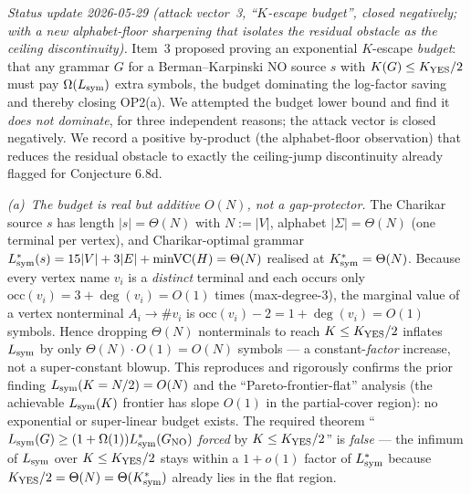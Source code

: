 \documentclass[
]{article}
\begin{document}
\emph{Status update 2026-05-29 (attack vector~3, ``$K$-escape budget'',
closed negatively; with a new alphabet-floor sharpening that
isolates the residual obstacle as the ceiling discontinuity).} Item~3
proposed proving an exponential $K$-escape \emph{budget}: that any
grammar $G$ for a Berman--Karpinski NO source $s$ with $K(G) \leq
K_{\rm YES}/2$ must pay $\Omega(L_{\rm sym})$ extra symbols, the budget
dominating the log-factor saving and thereby closing OP2(a). We
attempted the budget lower bound and find it \emph{does not dominate},
for three independent reasons; the attack vector is closed negatively.
We record a positive by-product (the alphabet-floor observation)
that reduces the residual obstacle to exactly the ceiling-jump
discontinuity already flagged for Conjecture 6.8d.

\emph{(a)~The budget is real but additive $O(N)$, not a
gap-protector.} The Charikar source $s$ has length $|s| = \Theta(N)$
with $N := |V|$, alphabet $|\Sigma| = \Theta(N)$ (one terminal per
vertex), and Charikar-optimal grammar $L^*_{\rm sym}(s) = 15|V| +
3|E| + \mathrm{minVC}(H) = \Theta(N)$ realised at $K^*_{\rm sym} =
\Theta(N)$. Because every vertex name $v_i$ is a \emph{distinct}
terminal and each occurs only $\mathrm{occ}(v_i) = 3 + \deg(v_i) =
O(1)$ times (max-degree-3), the marginal value of a vertex
nonterminal $A_i \to \#v_i$ is $\mathrm{occ}(v_i) - 2 = 1 +
\deg(v_i) = O(1)$ symbols. Hence dropping $\Theta(N)$ nonterminals to
reach $K \leq K_{\rm YES}/2$ inflates $L_{\rm sym}$ by only
$\Theta(N) \cdot O(1) = O(N)$ symbols --- a constant-\emph{factor}
increase, not a super-constant blowup. This reproduces and rigorously
confirms the prior finding $L_{\rm sym}(K = N/2) = O(N)$ and the
``Pareto-frontier-flat'' analysis (the achievable $L_{\rm
sym}(K)$ frontier has slope $O(1)$ in the partial-cover region): no
exponential or super-linear budget exists. The required theorem
``$L_{\rm sym}(G) \geq (1 + \Omega(1)) L^*_{\rm sym}(G_{\rm NO})$
\emph{forced} by $K \leq K_{\rm YES}/2$'' is \emph{false} --- the
infimum of $L_{\rm sym}$ over $K \leq K_{\rm YES}/2$ stays within a
$1 + o(1)$ factor of $L^*_{\rm sym}$ because $K_{\rm YES}/2 =
\Theta(N) = \Theta(K^*_{\rm sym})$ already lies in the flat region.
\end{document}

